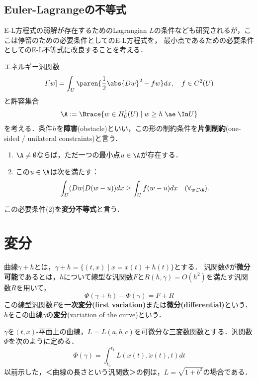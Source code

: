 \documentclass[uplatex,dvipdfmx]{jsreport}
\begin{document}
\subsection{Euler-Lagrangeの不等式}

\begin{tcolorbox}[colframe=ForestGreen, colback=ForestGreen!10!white,breakable,colbacktitle=ForestGreen!40!white,coltitle=black,fonttitle=\bfseries\sffamily,
title=]
    E-L方程式の弱解が存在するためのLagrangian $L$の条件なども研究されるが，ここは停留のための必要条件としてのE-L方程式を，
    最小点であるための必要条件としてのE-L不等式に改良することを考える．
\end{tcolorbox}

\begin{problem}
    エネルギー汎関数
    \[I[w]=\int_U\paren{\frac{1}{2}\abs{Dw}^2-fw}dx,\quad f\in C^2(U)\]
    と許容集合
    \[\A:=\Brace{w\in H^1_0(U)\mid w\ge h\;\ae\;\In U}\]
    を考える．条件$h$を\textbf{障害}(obstacle)といい，この形の制約条件を\textbf{片側制約}(one-sided / unilateral constraints)と言う．
\end{problem}

\begin{theorem}\mbox{}
    \begin{enumerate}
        \item $\A\ne\emptyset$ならば，ただ一つの最小点$u\in\A$が存在する．
        \item この$u\in\A$は次を満たす：
        \[\int_U(Dw|D(w-u))dx\ge\int_Uf(w-u)dx\quad(\forall_{w\in\A}).\]
    \end{enumerate}
    この必要条件(2)を\textbf{変分不等式}と言う．
\end{theorem}

\section{変分}

\begin{definition}
    曲線$\gamma+h$とは，$\gamma+h=\{(t,x)\mid x=x(t)+h(t)\}$とする．
    汎関数$\Phi$が\textbf{微分可能}であるとは，$h$について線型な汎関数$F$と$R(h,\gamma)=O(h^2)$を満たす汎関数$R$を用いて，
    \[ \Phi(\gamma+h)-\Phi(\gamma) = F+R \]
    この線型汎関数$F$を\textbf{一次変分(first variation)}または\textbf{微分(differential)}という．$h$をこの曲線$\gamma$の\textbf{変分}(variation of the curve)という．
\end{definition}
\begin{example}
    $\gamma$を$(t,x)$-平面上の曲線，$L=L(a,b,c)$を可微分な三変数関数とする．汎関数$\Phi$を次のように定める．
    \[ \Phi(\gamma) = \int^{t_1}_{t_0}L(x(t),\dot{x}(t),t)dt \]
    以前示した，＜曲線の長さという汎関数＞の例は，$L=\sqrt{1+b^2}$の場合である．
\end{example}
\end{document}
